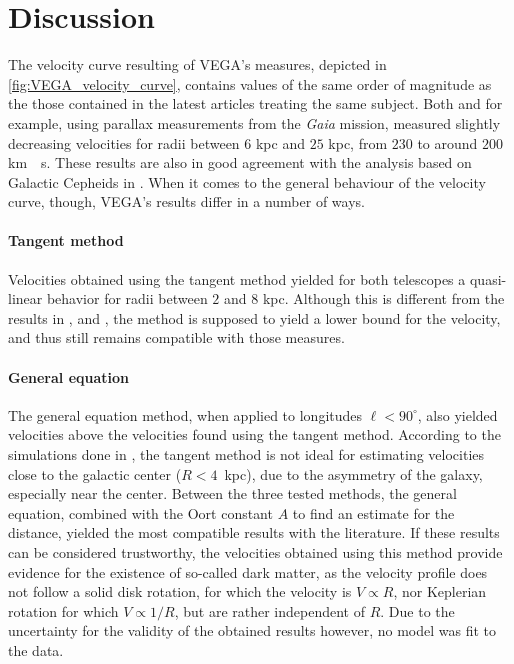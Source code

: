 \section{Discussion}
The velocity curve resulting of VEGA's measures, depicted in \autoref{fig:VEGA_velocity_curve}, contains values of the same order of magnitude as the those contained in the latest articles treating the same subject.
Both \cite{ou_dark_2024} and \cite{eilers_circular_2019} for example, using parallax measurements from the \emph{Gaia} mission, measured slightly decreasing velocities for radii between $6$ kpc and $25$ kpc, from $230$ to around $200$ \unit{km \per s}.
These results are also in good agreement with the analysis based on Galactic Cepheids in \cite{mroz_rotation_2019}.
When it comes to the general behaviour of the velocity curve, though, VEGA's results differ in a number of ways.

\paragraph{Tangent method} 
Velocities obtained using the tangent method yielded for both telescopes a quasi-linear behavior for radii between $2$ and $8$ kpc. Although this is different from the results in \cite{ou_dark_2024}, \cite{eilers_circular_2019} and \cite{mroz_rotation_2019}, the method is supposed to yield a lower bound for the velocity, and thus still remains compatible with those measures.

\paragraph{General equation}
The general equation method, when applied to longitudes $\ell < 90^\circ$, also yielded velocities above the velocities found using the tangent method. According to the simulations done in \cite{chemin_incorrect_2015}, the tangent method is not ideal for estimating velocities close to the galactic center \mbox{($R < 4$ kpc)}, due to the asymmetry of the galaxy, especially near the center.
Between the three tested methods, the general equation, combined with the Oort constant $A$ to find an estimate for the distance, yielded the most compatible results with the literature. If these results can be considered trustworthy, the velocities obtained using this method provide evidence for the existence of so-called dark matter, as the velocity profile does not follow a solid disk rotation, for which the velocity is $V \propto R$, nor Keplerian rotation for which $V \propto 1/R$, but are rather independent of $R$. Due to the uncertainty for the validity of the obtained results however, no model was fit to the data.

